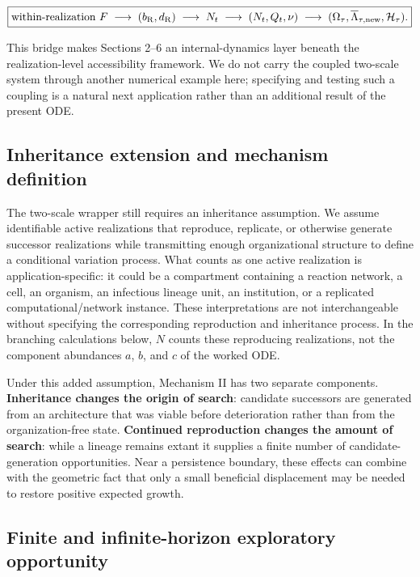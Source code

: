 \documentclass[11pt,a4paper]{article}
\begin{document}
\begin{equation*}
\boxed{
\text{within-realization }F
\;\longrightarrow\;
(b_{\rm R},d_{\rm R})
\;\longrightarrow\;
N_t
\;\longrightarrow\;
(N_t,Q_t,\nu)
\;\longrightarrow\;
(\Omega_\tau,\overline\Lambda_{\tau,\rm new},\mathcal H_\tau).
}
\end{equation*}

This bridge makes Sections 2--6 an internal-dynamics layer beneath the realization-level accessibility framework. We do not carry the coupled two-scale system through another numerical example here; specifying and testing such a coupling is a natural next application rather than an additional result of the present ODE.

\subsection{Inheritance extension and mechanism definition}

The two-scale wrapper still requires an inheritance assumption. We assume identifiable active realizations that reproduce, replicate, or otherwise generate successor realizations while transmitting enough organizational structure to define a conditional variation process. What counts as one active realization is application-specific: it could be a compartment containing a reaction network, a cell, an organism, an infectious lineage unit, an institution, or a replicated computational/network instance. These interpretations are not interchangeable without specifying the corresponding reproduction and inheritance process. In the branching calculations below, $N$ counts these reproducing realizations, not the component abundances $a$, $b$, and $c$ of the worked ODE.

Under this added assumption, Mechanism II has two separate components. \textbf{Inheritance changes the origin of search}: candidate successors are generated from an architecture that was viable before deterioration rather than from the organization-free state. \textbf{Continued reproduction changes the amount of search}: while a lineage remains extant it supplies a finite number of candidate-generation opportunities. Near a persistence boundary, these effects can combine with the geometric fact that only a small beneficial displacement may be needed to restore positive expected growth.

\subsection{Finite and infinite-horizon exploratory opportunity}
\end{document}
